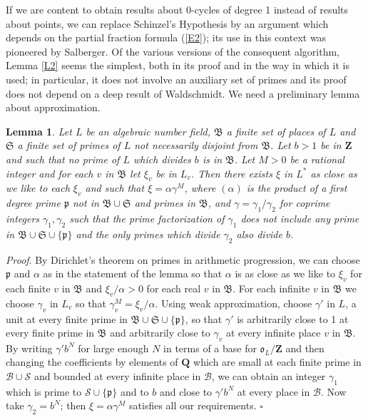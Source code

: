 \documentclass[12pt]{article}
\def\bQ{{\mathbf Q}}
\def\bZ{{\mathbf Z}}
\def\fB{{\mathfrak B}}
\def\fo{{\mathfrak o}}
\def\fp{{\mathfrak p}}
\def\fS{{\mathfrak S}}
\def\ga{{\alpha}}
\def\gg{{\gamma}}
\def\sB{{\mathcal B}}
\def\sS{{\mathcal S}}
\def\qed{{\hfill$\square$}}
\def\ble{\begin{lemma} \label}
\def\ele{\end{lemma}}
\newtheorem{lemma}{Lemma}
\begin{document}
If we are content to obtain results about 0-cycles of degree 1 instead of
results about points, we can replace Schinzel's Hypothesis by an
argument which depends on the partial fraction formula (\ref{E2}); its use
in this context was pioneered by
Salberger. Of the various versions of the consequent algorithm, Lemma
\ref{L2} seems the simplest, both in its proof and in the way in which
it is used; in particular, it does not involve an auxiliary set of
primes and its proof does not depend on a deep result of Waldschmidt.
We need a preliminary lemma about approximation.
\ble{L3} Let $L$ be an algebraic number field, $\fB$ a finite set of places
of $L$ and $\fS$ a finite set of primes of $L$ not necessarily disjoint from
$\fB$. Let $b>1$ be in $\bZ$ and such that no prime of $L$ which divides $b$
is in $\fB$. Let $M>0$ be a rational integer and for each $v$ in $\fB$ let $\xi_v$
be in $L_v$. Then there exists $\xi$ in $L^*$ as close as we like to each
$\xi_v$ and such that $\xi=\ga\gg^M$, where $(\ga)$ is the product of a first
degree prime $\fp$ not in $\fB\cup\fS$ and primes in $\fB$, and
$\gg=\gg_1/\gg_2$ for coprime integers $\gg_1,\gg_2$ such that the prime
factorization of $\gg_1$ does not include any prime in $\fB\cup\fS\cup\{\fp\}$
and the only primes which divide $\gg_2$ also divide $b$.
\ele
\emph{Proof}. By Dirichlet's theorem on primes in arithmetic progression, we
can choose $\fp$ and
$\ga$ as in the statement of the lemma so that $\ga$ is as close
as we like to $\xi_v$ for each finite $v$ in $\fB$ and $\xi_v/\ga>0$ for each
real $v$ in $\fB$. For each
infinite $v$ in $\fB$ we choose $\gg_v$ in $L_v$ so that
$\gg_v^M=\xi_v/\ga$. Using weak approximation, choose $\gg'$ in $L$,
a unit at every finite prime in $\fB\cup\fS\cup\{\fp\}$, so that $\gg'$ is
arbitrarily close to 1 at every finite prime in $\fB$ and arbitrarily close
to $\gg_v$ at every infinite place $v$ in $\fB$. By writing $\gg'b^N$ for
large enough $N$ in terms of a base for $\fo_L/\bZ$ and
then changing the
coefficients by elements of $\bQ$ which are small at each finite prime in
$\sB\cup\sS$ and bounded at every infinite place in $\sB$, we can obtain an
integer $\gg_1$ which is prime to $\sS\cup\{\fp\}$ and to $b$
and close to $\gg'b^N$
at every place in $\sB$. Now take $\gg_2=b^N$; then $\xi=\ga\gg^M$ satisfies
all our requirements.  \qed
\end{document}
